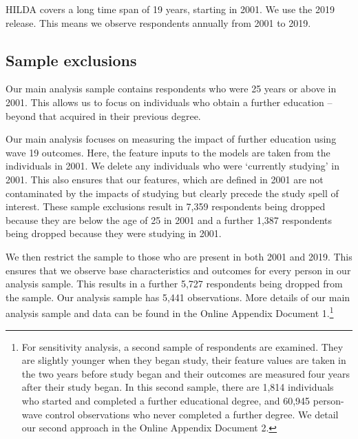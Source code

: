 \documentclass[12pt, a4paper]{article}
\begin{document}
HILDA covers a long time span of 19 years, starting in 2001. We use the 2019 release. This means we observe respondents annually from 2001 to 2019.

\subsection{Sample exclusions}

Our main analysis sample contains respondents who were 25 years or above in 2001. This allows us to focus on individuals who obtain a further education – beyond that acquired in their previous degree. 

Our main analysis focuses on measuring the impact of further education using
wave 19 outcomes. Here, the feature inputs to the models are taken from the
individuals in 2001. We delete any individuals who were ‘currently studying’ in 2001. This also ensures that our features, which are defined in 2001 are not
contaminated by the impacts of studying but clearly precede the study spell of
interest. These sample exclusions result in 7,359 respondents being dropped
because they are below the age of 25 in 2001 and a further 1,387 respondents
being dropped because they were studying in 2001.

We then restrict the sample to those who are present in both 2001 and 2019. This ensures that we observe base characteristics and outcomes for every person in our analysis sample. This results in a further 5,727 respondents being dropped from the sample. Our analysis sample has 5,441 observations. More details of our main analysis sample and data can be found in the Online Appendix Document 1.\footnote{For sensitivity analysis, a second sample of respondents are examined. They are slightly younger when they began study, their feature values are taken in the two years before study began and their outcomes are measured four years after their study began. In this second sample, there are 1,814 individuals who started and completed a further educational degree, and 60,945 person-wave control observations who never completed a further degree. We detail our second approach in the Online Appendix Document 2.}

\end{document}
